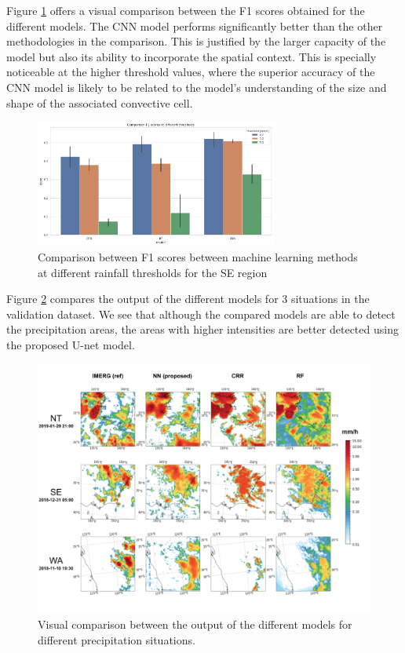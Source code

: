 \documentclass[3p,times]{elsarticle}
\begin{document}
Figure \ref{model_cmp} offers a visual comparison between the F1 scores obtained for the different models. The CNN model performs significantly better than the other methodologies in the comparison. This is justified by the larger capacity of the model but also its ability to incorporate the spatial context. This is specially noticeable at the higher threshold values, where the superior accuracy of the CNN model is likely to be related to the model's understanding of the size and shape of the associated convective cell.

\begin{figure}%
    \includegraphics[width=8cm]{model_cmp.png}
    \caption{Comparison between F1 scores between machine learning methods at different rainfall thresholds for the SE region}%
    \label{model_cmp}%
\end{figure}

Figure \ref{baseline_cmp} compares the output of the different models for 3 situations in the validation dataset. We see that although the compared models are able to detect the precipitation areas, the areas with higher intensities are better detected using the proposed U-net model.

\begin{figure}%
    \includegraphics[width=14cm]{baseline_cmp.png}
	\caption{Visual comparison between the output of the different models for different precipitation situations.}%
    \label{baseline_cmp}%
\end{figure}
\end{document}
